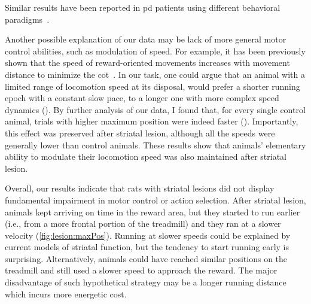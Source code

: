 Similar results have been reported in \gls{pd} patients using different behavioral paradigms~\cite{Mazzoni2007, Schmidt2008Brain}.
\par
Another possible explanation of our data may be lack of more general motor control abilities, such as modulation of speed.
For example, it has been previously shown that the speed of reward-oriented movements increases with movement distance to minimize the \gls{cot}~\cite{Shadmehr2010Jneurosci}.
In our task, one could argue that an animal with a limited range of locomotion speed at its disposal, would prefer a shorter running epoch with a constant slow pace, to a longer one with more complex speed dynamics ().
By further analysis of our data, I found that, for every single control animal, trials with higher maximum position were indeed faster ().
Importantly, this effect was preserved after striatal lesion, although all the speeds were generally lower than control animals.
These results show that animals' elementary ability to modulate their locomotion speed was also maintained after striatal lesion.
\par
Overall, our results indicate that rats with striatal lesions did not display fundamental impairment in motor control or action selection.
After striatal lesion, animals kept arriving on time in the reward area, but they started to run earlier (i.e., from a more frontal portion of the treadmill) and they ran at a slower velocity (\autoref{fig:lesion:maxPos}).\footnotemark
{}
Running at slower speeds could be explained by current models of striatal function, but the tendency to start running early is surprising.
Alternatively, animals could have reached similar positions on the treadmill and still used a slower speed to approach the reward.
The major disadvantage of such hypothetical strategy may be a longer running distance which incurs more energetic cost.
